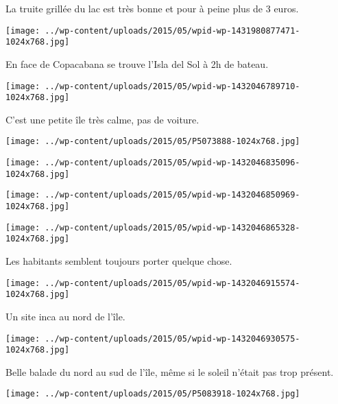  \newline
 La truite grillée du lac est très bonne et pour à peine plus de 3 euros. \newline
 \newline
\centerline{\texttt{[image: ../wp-content/uploads/2015/05/wpid-wp-1431980877471-1024x768.jpg]} } 
 \newline
 En face de Copacabana se trouve l'Isla del Sol à 2h de bateau. \newline
 \newline
\centerline{\texttt{[image: ../wp-content/uploads/2015/05/wpid-wp-1432046789710-1024x768.jpg]} } 
 \newline
 C'est une petite île très calme, pas de voiture. \newline
 \newline
\centerline{\texttt{[image: ../wp-content/uploads/2015/05/P5073888-1024x768.jpg]} } 
 \newline
 \newline
\centerline{\texttt{[image: ../wp-content/uploads/2015/05/wpid-wp-1432046835096-1024x768.jpg]} } 
 \newline
 \newline
\centerline{\texttt{[image: ../wp-content/uploads/2015/05/wpid-wp-1432046850969-1024x768.jpg]} } 
 \newline
 \newline
\centerline{\texttt{[image: ../wp-content/uploads/2015/05/wpid-wp-1432046865328-1024x768.jpg]} } 
 \newline
 Les habitants semblent toujours porter quelque chose. \newline
 \newline
\centerline{\texttt{[image: ../wp-content/uploads/2015/05/wpid-wp-1432046915574-1024x768.jpg]} } 
 \newline
 Un site inca au nord de l'île. \newline
 \newline
\centerline{\texttt{[image: ../wp-content/uploads/2015/05/wpid-wp-1432046930575-1024x768.jpg]} } 
 \newline
 Belle balade du nord au sud de l'île, même si le soleil n'était pas trop présent. \newline
 \newline
\centerline{\texttt{[image: ../wp-content/uploads/2015/05/P5083918-1024x768.jpg]} } 
 \newline
 \newline

